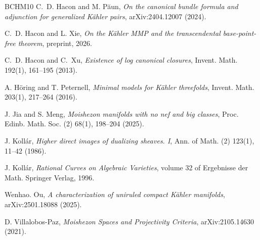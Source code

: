 \documentclass[11pt]{amsart}
\numberwithin{equation}{section}
\theoremstyle{definition}
\theoremstyle{definition}
\theoremstyle{definition}
\begin{document}
\begin{thebibliography}{BCHM10}
 C.~D. Hacon and M. P\u{a}un, {\it On the canonical bundle formula and adjunction for generalized K\"ahler pairs}, arXiv:2404.12007 (2024).

 C.~D. Hacon and L. Xie, {\it On the K\"ahler MMP and the transcendental base-point-free theorem}, preprint, 2026.

 C.~D. Hacon and C.~Xu, {\it Existence of log canonical closures}, Invent. Math. 192(1), 161--195 (2013).

 A. H\"oring and T. Peternell, {\it Minimal models for K\"ahler threefolds}, Invent. Math. 203(1), 217--264 (2016).

 J. Jia and S. Meng, {\it Moishezon manifolds with no nef and big classes}, Proc. Edinb. Math. Soc. (2) 68(1), 198--204 (2025).


 J. Koll\'ar, {\it Higher direct images of dualizing sheaves. I}, Ann. of Math. (2) 123(1), 11--42 (1986).

 J. Koll\'ar, {\it Rational Curves on Algebraic Varieties}, volume 32 of
Ergebnisse der Math. Springer Verlag, 1996.


 Wenhao. Ou, {\it A characterization of uniruled compact K\"ahler manifolds}, arXiv:2501.18088 (2025).

 D. Villalobos-Paz, {\it Moishezon Spaces and Projectivity Criteria}, arXiv:2105.14630 (2021).

\end{thebibliography}
\end{document}
